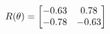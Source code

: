 \documentclass[preview]{standalone}
\begin{document}
\begin{align*}
\special{dvisvgm:raw <g id='unique000'>}R(\theta) = \begin{bmatrix}-0.63 & 0.78\\-0.78 & -0.63\end{bmatrix}\special{dvisvgm:raw </g>}
\end{align*}
\end{document}
